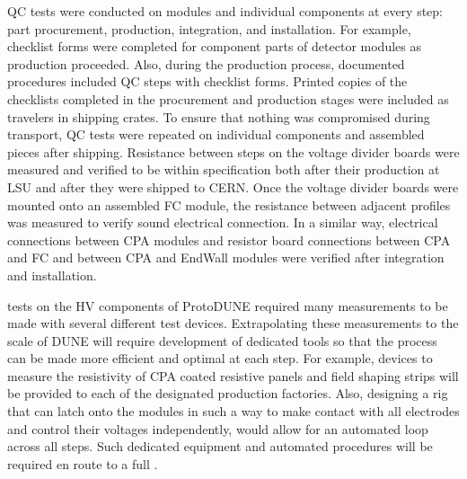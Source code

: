 QC tests were conducted on  modules and individual components at every step: %
part procurement, production, integration, and installation.  For example, checklist forms were completed for component parts of detector modules as production proceeded.  Also, during the production process, documented procedures included QC steps with checklist forms.  Printed copies of the checklists completed in the procurement and production stages were included as travelers in shipping crates.  
To ensure that nothing was compromised during transport, QC tests were repeated on individual components and assembled pieces after shipping. 
Resistance between steps on the voltage divider boards were measured and verified to be within specification both after their production at LSU and after they were shipped to CERN.
Once the voltage divider boards were mounted onto an assembled FC module, the resistance between adjacent profiles was measured to verify sound electrical connection.
In a similar way, electrical connections between CPA modules and resistor board connections between CPA and FC and between CPA and EndWall modules were verified after integration and installation.

 tests on the HV components of ProtoDUNE required many measurements to be made with several different test devices.  Extrapolating these measurements to the scale of DUNE will require development of dedicated  tools so that the  process can be made more efficient and optimal at each step.
For example, devices to measure the resistivity of CPA coated resistive panels and field shaping strips will be provided to each of the designated production factories.  Also, designing a rig that can latch onto the  modules in such a way to make contact with all electrodes and control their voltages independently, would allow for an automated loop across all steps.
Such dedicated equipment and automated procedures will be required en route to a full .

